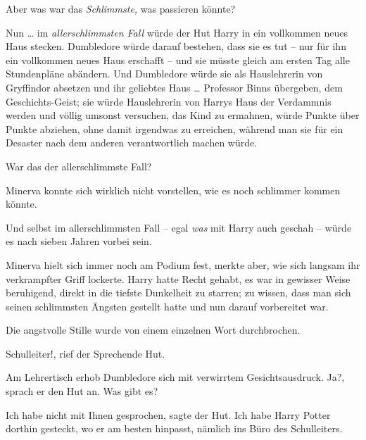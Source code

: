 Aber was war das \emph{Schlimmste,} was passieren könnte?

Nun … im \emph{allerschlimmsten Fall} würde der Hut Harry in ein vollkommen
neues Haus stecken. Dumbledore würde darauf bestehen, dass sie es tut – nur für
ihn ein vollkommen neues Haus erschafft – und sie müsste gleich am ersten Tag
alle Stundenpläne abändern. Und Dumbledore würde sie als Hauslehrerin von
Gryffindor absetzen und ihr geliebtes Haus … Professor Binns übergeben, dem
Geschichts-Geist; sie würde Hauslehrerin von Harrys Haus der Verdammnis werden
und völlig umsonst versuchen, das Kind zu ermahnen, würde Punkte über Punkte
abziehen, ohne damit irgendwas zu erreichen, während man sie für ein Desaster
nach dem anderen verantwortlich machen würde.

War das der allerschlimmste Fall?

Minerva konnte sich wirklich nicht vorstellen, wie es noch schlimmer kommen
könnte.

Und selbst im allerschlimmsten Fall – egal \emph{was} mit Harry auch geschah –
würde es nach sieben Jahren vorbei sein.

Minerva hielt sich immer noch am Podium fest, merkte aber, wie sich langsam ihr
verkrampfter Griff lockerte. Harry hatte Recht gehabt, es war in gewisser Weise
beruhigend, direkt in die tiefste Dunkelheit zu starren; zu wissen, dass man
sich seinen schlimmsten Ängsten gestellt hatte und nun darauf vorbereitet war.

Die angstvolle Stille wurde von einem einzelnen Wort durchbrochen.

\glqq{}Schulleiter!\grqq{}, rief der Sprechende Hut.

Am Lehrertisch erhob Dumbledore sich mit verwirrtem Gesichtsausdruck. \glqq{}
Ja?\grqq{}, sprach er den Hut an. \glqq{}Was gibt es?\grqq{}

\glqq{}Ich habe nicht mit Ihnen gesprochen\grqq{}, sagte der Hut. \glqq{}Ich habe
Harry Potter dorthin gesteckt, wo er am besten hinpasst, nämlich ins Büro des
Schulleiters.\grqq{}